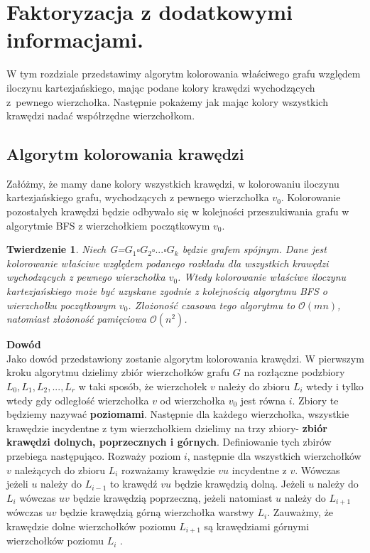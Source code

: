 \documentclass[12pt,a4paper,titlepage]{article}
\newtheorem{twr}{Twierdzenie}
\newcommand\tab[1][1cm]{\hspace*{#1}}
\begin{document}
\section{Faktoryzacja z dodatkowymi informacjami.}
W tym rozdziale przedstawimy algorytm kolorowania właściwego grafu względem iloczynu kartezjańskiego, mając podane kolory krawędzi wychodzących z~pewnego wierzchołka. Następnie pokażemy jak mając kolory wszystkich krawędzi nadać współrzędne wierzchołkom. 
\\
\subsection{Algorytm kolorowania krawędzi}
Załóżmy, że mamy dane kolory wszystkich krawędzi, w kolorowaniu iloczynu kartezjańskiego grafu, wychodzących z pewnego wierzchołka $v_0$. Kolorowanie pozostałych krawędzi będzie odbywało się w kolejności przeszukiwania grafu w algorytmie BFS z wierzchołkiem początkowym $v_0$. \\
\begin{twr}Niech G=$G_1 \square G_2 \square ... \square G_k$ będzie grafem spójnym. Dane jest kolorowanie właściwe względem podanego rozkładu dla wszystkich krawędzi wychodzących z pewnego wierzchołka $v_0$. Wtedy kolorowanie właściwe iloczynu kartezjańskiego może być uzyskane zgodnie z kolejnością algorytmu BFS o wierzchołku początkowym $v_0$. Złożoność czasowa tego algorytmu to $\mathcal{O}(mn)$, natomiast złożoność pamięciowa $\mathcal{O}(n^2)$.
\end{twr}
\tab[-0.6cm]\textbf{Dowód}\\
\tab[0.6cm]Jako dowód przedstawiony zostanie algorytm kolorowania krawędzi. W pierwszym kroku algorytmu dzielimy zbiór wierzchołków grafu $G$ na rozłączne podzbiory $L_0 , L_1, L_2 , ..., L_r$ w taki sposób, że wierzchołek $v$ należy do zbioru $L_i$ wtedy i tylko wtedy gdy odległość wierzchołka $v$ od wierzchołka $v_0$ jest równa $i$. Zbiory te będziemy nazywać \textbf{poziomami}. Następnie dla każdego wierzchołka, wszystkie krawędzie incydentne z tym wierzchołkiem dzielimy na trzy zbiory- \textbf{zbiór krawędzi dolnych, poprzecznych i górnych}. Definiowanie tych zbirów przebiega następująco. Rozważy poziom $i$, następnie dla wszystkich wierzchołków $v$ należących do zbioru $L_i$ rozważamy krawędzie $vu$ incydentne z $v$. Wówczas jeżeli $u$ należy do $L_{i-1}$ to krawędź $vu$ będzie krawędzią dolną. Jeżeli $u$ należy do $L_i$ wówczas $uv$ będzie krawędzią poprzeczną, jeżeli natomiast $u$ należy do $L_{i+1}$ wówczas $uv$ będzie krawędzią górną wierzchołka warstwy $L_i$. Zauważmy, że krawędzie dolne wierzchołków poziomu $L_{i+1}$ są krawędziami górnymi wierzchołków poziomu $L_{i}$ .\\
\end{document}
